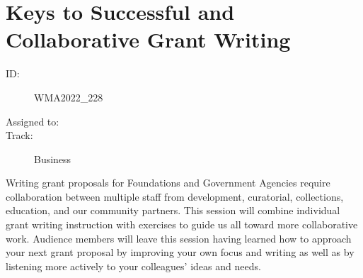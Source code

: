 \documentclass{report}
\begin{document}
              

              
        
          \newpage
          \section{ Keys to Successful and Collaborative Grant Writing }
            \begin{description}
              \item [ID:]
              WMA2022\_228

              \item [Assigned to:]
                \item [Track:]Business~
              \end{description}

              Writing grant proposals for Foundations and Government Agencies require collaboration between multiple staff from development, curatorial, collections, education, and our community partners. This session will combine individual grant writing instruction with exercises to guide us all toward more collaborative work. Audience members will leave this session having learned how to approach your next grant proposal by improving your own focus and writing as well as by listening more actively to your colleagues’ ideas and needs. 
\end{document}
